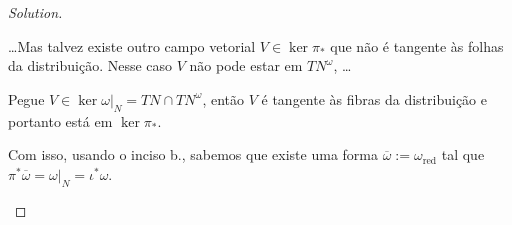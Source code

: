 \begin{proof}[Solution]
\begin{enumerate}[label=\alph*.]
		{\color{5}…Mas talvez existe outro campo vetorial $V\in\ker\pi_*$ que não é tangente às folhas da distribuição. Nesse caso $V$  não pode estar em $TN^\omega$, …}

		Pegue $V\in\ker \omega |_{N}=TN\cap TN^\omega$, então $V$ é tangente às fibras da distribuição e portanto está em $\ker \pi_*$.

		Com isso, usando o inciso b., sabemos que existe uma forma  $\overline{\omega}:=\omega_{\operatorname{red}}$ tal que $\pi^*\overline{\omega}=\omega|_{N}=\iota^*\omega$.

\end{enumerate}	
\end{proof}


